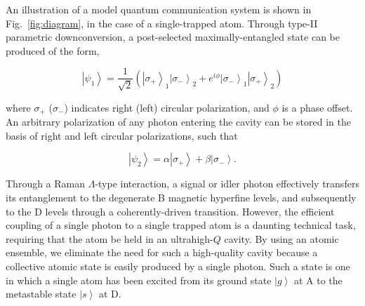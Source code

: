 \documentclass[aps,twocolumn,secnumarabic,amsmath,amssymb,pra,groupedaddress,
showpacs, showkeys]{revtex4-1}
\newcommand{\ket}[1]{\left|#1\right\rangle}
\newcommand{\pna}[1]{\left(#1\right)}
\newcommand{\eqn}[1]{
\begin{equation}
	#1
\end{equation}
}
\begin{document}
An illustration of a model quantum communication system is shown in
Fig.~\ref{fig:diagram}, in the case of a single-trapped atom. Through type-II
parametric downconversion, a post-selected maximally-entangled state can be
produced of the form,
\eqn{
\ket{\psi_1} = \frac{1}{\sqrt{2}}\pna{\ket{\sigma_{+}}_1\ket{\sigma_{-}}_2 + e^{i\phi} \ket{\sigma_{-}}_1 \ket{\sigma_{+}}_2 } \label{eqn:singlet}
}
where $\sigma_{+}$ ($\sigma_{-}$) indicates right (left) circular polarization,
and $\phi$ is a phase offset. An arbitrary polarization of any photon entering
the cavity can be stored in the basis of right and left circular polarizations,
such that
\eqn{
\ket{\psi_2} = \alpha \ket{\sigma_{+}}+\beta \ket{\sigma_{-}}.
}
Through a Raman $\Lambda$-type interaction, a signal or idler photon
effectively transfers its entanglement to the degenerate B magnetic hyperfine
levels, and subsequently to the D levels through a coherently-driven
transition. However, the efficient coupling of a single photon to a single
trapped atom is a daunting technical task, requiring that the atom be held in
an ultrahigh-$Q$ cavity. By using an atomic ensemble, we eliminate the need for
such a high-quality cavity because a collective atomic state is easily produced
by a single photon. Such a state is one in which a single atom has been excited
from its ground state $\ket{g}$ at A to the metastable state $\ket{s}$ at D. 
\end{document}
